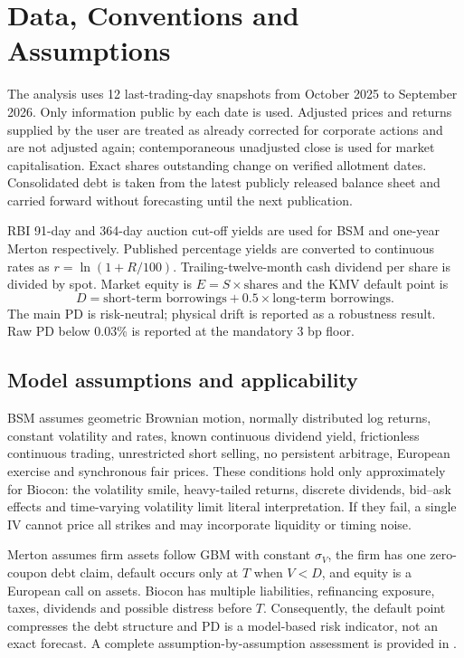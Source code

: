 \documentclass[10pt,a4paper]{article}
\newcommand{\sigV}{\sigma_V}
\begin{document}
\newpage
\section{Data, Conventions and Assumptions}
The analysis uses 12 last-trading-day snapshots from October 2025 to September 2026. Only information public by each date is used. Adjusted prices and returns supplied by the user are treated as already corrected for corporate actions and are not adjusted again; contemporaneous unadjusted close is used for market capitalisation. Exact shares outstanding change on verified allotment dates. Consolidated debt is taken from the latest publicly released balance sheet and carried forward without forecasting until the next publication.

RBI 91-day and 364-day auction cut-off yields are used for BSM and one-year Merton respectively. Published percentage yields are converted to continuous rates as $r=\ln(1+R/100)$. Trailing-twelve-month cash dividend per share is divided by spot. Market equity is $E=S\times\text{shares}$ and the KMV default point is
\[
D=\text{short-term borrowings}+0.5\times\text{long-term borrowings}.
\]
The main PD is risk-neutral; physical drift is reported as a robustness result. Raw PD below 0.03\% is reported at the mandatory 3 bp floor.

\subsection{Model assumptions and applicability}
BSM assumes geometric Brownian motion, normally distributed log returns, constant volatility and rates, known continuous dividend yield, frictionless continuous trading, unrestricted short selling, no persistent arbitrage, European exercise and synchronous fair prices. These conditions hold only approximately for Biocon: the volatility smile, heavy-tailed returns, discrete dividends, bid--ask effects and time-varying volatility limit literal interpretation. If they fail, a single IV cannot price all strikes and may incorporate liquidity or timing noise.

Merton assumes firm assets follow GBM with constant $\sigV$, the firm has one zero-coupon debt claim, default occurs only at $T$ when $V<D$, and equity is a European call on assets. Biocon has multiple liabilities, refinancing exposure, taxes, dividends and possible distress before $T$. Consequently, the default point compresses the debt structure and PD is a model-based risk indicator, not an exact forecast. A complete assumption-by-assumption assessment is provided in .
\end{document}
